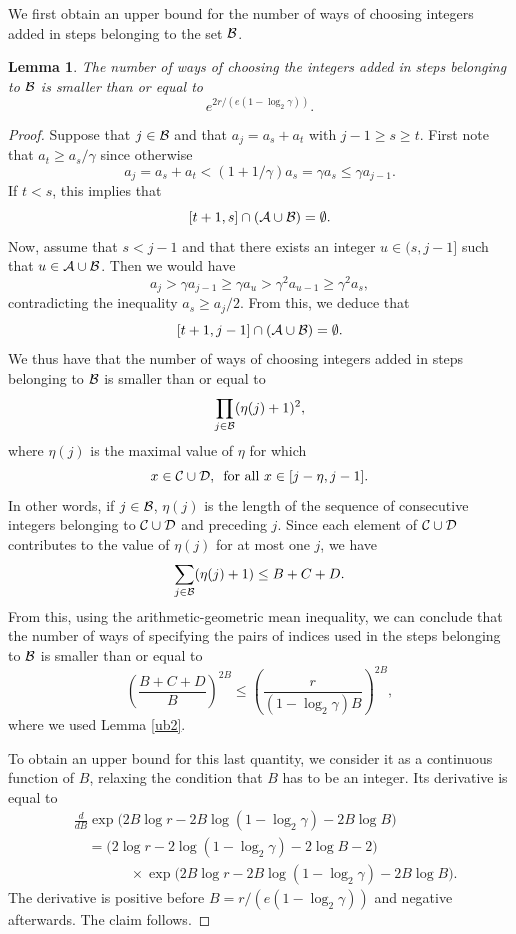 \documentclass{article}
\newtheorem{lemma}[theorem]{Lemma}
\theoremstyle{definition}
\begin{document}
We first obtain an upper bound for the number of ways of choosing integers added in steps belonging to the set ${\cal B}$.
\begin{lemma}\label{ub5}
The number of ways of choosing the integers added in steps belonging to ${\cal B}$ is smaller than or equal to
$$
e^{2r/(e(1-\log_2 \gamma))}.
$$
\end{lemma}

\begin{proof}
Suppose that $j\in {\cal B}$ and that $a_j=a_s+a_t$ with $j-1\ge s\ge t$. First note that $a_t\ge a_s/\gamma$ since otherwise
$$
a_j=a_s+a_t<(1+1/\gamma)a_s=\gamma a_s\le \gamma a_{j-1}.
$$
If $t<s$, this implies that
$$
[t+1,s]\cap({\cal A}\cup {\cal B})=\emptyset.
$$
Now, assume that $s<j-1$ and that there exists an integer $u\in (s, j-1]$ such that $u\in {\cal A}\cup{\cal B}$. Then we would have
$$
a_j> \gamma a_{j-1}\ge \gamma a_u>\gamma^2 a_{u-1}\ge \gamma^2 a_s,
$$
contradicting the inequality $a_s\ge a_j/2$.
From this, we deduce that
$$
[t+1,j-1]\cap({\cal A}\cup {\cal B})=\emptyset.
$$
We thus have that the number of ways of choosing integers added in steps belonging to ${\cal B}$ is smaller than or equal to
$$
\prod_{j\in{\cal B}}(\eta(j)+1)^2,
$$
where $\eta(j)$ is the maximal value of $\eta$ for which
$$
x\in {\cal C}\cup {\cal D},\, \mbox{ for all } x\in[j-\eta,j-1].
$$
In other words, if $j\in{\cal B}$, $\eta(j)$ is the length of the sequence of consecutive integers belonging to ${\cal C}\cup {\cal D}$ and preceding $j$. Since each element of ${\cal C}\cup {\cal D}$ contributes to the value of $\eta(j)$ for at most one $j$, we have
$$
\sum_{j\in{\cal B}}(\eta(j)+1)\le B+C+D.
$$
From this, using the arithmetic-geometric mean inequality, we can conclude that the number of ways of specifying the pairs of indices used in the steps belonging to ${\cal B}$ is smaller than or equal to
\begin{equation*}
\left(\frac{B+C+D}{B}\right)^{2B}\leq \left(\frac{r}{(1-\log_2\gamma)B}\right)^{2B},
\end{equation*}
where we used Lemma \ref{ub2}.

To obtain an upper bound for this last quantity, we consider it as a continuous function of $B$, relaxing the condition that $B$ has to be an integer. Its derivative is equal to
\begin{align*}
&\frac{d}{dB}
\exp\big(2B\log r-2B\log(1-\log_2\gamma)-2B\log B\big)\\
&\quad=
\big(2\log r-2\log(1-\log_2\gamma)-2\log B-2\big)\\
&\qquad\qquad\times
\exp\big(2B\log r-2B\log(1-\log_2\gamma)-2B\log B\big).
\end{align*}
The derivative is positive before
$
B=r/(e(1-\log_2\gamma))
$
and negative afterwards. The claim follows.
\end{proof}
\end{document}

